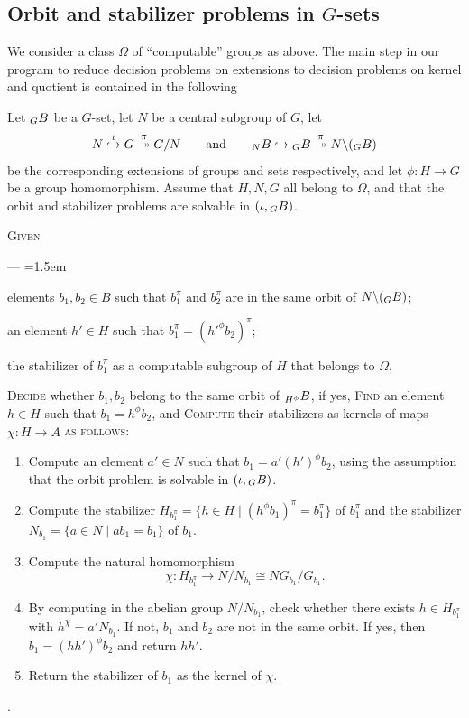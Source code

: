 \documentclass{amsart}
\begin{document}
\subsection{Orbit and stabilizer problems in \boldmath $G$-sets}
We consider a class $\Omega$ of ``computable'' groups as above. The
main step in our program to reduce decision problems on extensions
to decision problems on kernel and quotient is contained in the
following
\begin{algo}\label{algo:RedConjAndEqPr}
  Let $\subscript G B$ be a $G$-set, let $N$ be a central subgroup of $G$, let
  \[N\overset\iota\hookrightarrow G \overset\pi\twoheadrightarrow
    G/N\qquad\text{and}\qquad \subscript NB\hookrightarrow\subscript G B
    \overset\pi\twoheadrightarrow N\backslash(\subscript G B)
  \]
  be the corresponding extensions of groups and sets respectively, and
  let $\phi\colon H\to G$ be a group homomorphism. Assume that $H,N,G$
  all belong to $\Omega$, and that the orbit and stabilizer problems
  are solvable in $(\iota,\subscript G B)$.
  
  \textsc{Given} 
  \begin{list}{---}{\leftmargin=0pt \itemindent=1.5em}
  \item elements $b_1,b_2\in B$ such that $b_1^\pi$ and $b_2^\pi$ are
    in the same orbit of $N\backslash(\subscript G B)$;
  \item an element $h'\in H$ such that $b_1^\pi=(h'^\phi b_2)^\pi$;
  \item the stabilizer of $b_1^\pi$ as a computable subgroup of $H$
    that belongs to $\Omega$,
  \end{list}
  \textsc{Decide} whether $b_1,b_2$ belong to the same orbit of
  $\subscript{H^\phi}{B}$, if yes, \textsc{Find} an element $h\in H$ such that $b_1=h^\phi b_2$, and
  \newline \textsc{Compute} their stabilizers as kernels of maps
  $\chi\colon\tilde H\to A$
  \textsc{as follows:}\upshape
  
  \begin{enumerate}
  \item Compute an element $a'\in N$ such that $b_1=a'(h')^\phi b_2$,
    using the assumption that the orbit problem is solvable in
    $(\iota,\subscript G B)$.\label{RCAPR:step:1}
  \item Compute the stabilizer
    $H_{b_1^\pi}=\{h\in H\mid (h^\phi b_1)^\pi=b_1^\pi\}$ of $b_1^\pi$
    and the stabilizer $N_{b_1}=\{a\in N\mid a b_1=b_1\}$ of $b_1$.
  \item Compute the natural homomorphism\label{RCAPR:step:3}
    \[\chi\colon H_{b_1^\pi}\to N/N_{b_1}\cong N G_{b_1}/G_{b_1}.\]
  \item By computing in the abelian group $N/N_{b_1}$, check whether
    there exists $h\in H_{b_1^\pi}$ with $h^\chi=a' N_{b_1}$. If not,
    $b_1$ and $b_2$ are not in the same orbit. If yes, then
    $b_1=(h h')^\phi b_2$ and return $h h'$.
  \item Return the stabilizer of $b_1$ as the kernel of $\chi$. 
  \end{enumerate}.
\end{algo}
\end{document}
